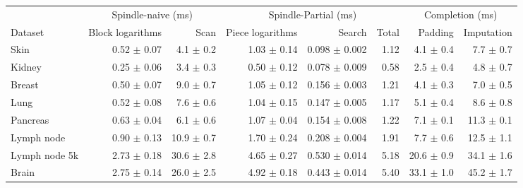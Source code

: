 \begin{tabular}{lrrrrrrr}
\toprule
 & \multicolumn{2}{c}{Spindle-naive (ms)} & \multicolumn{3}{c}{Spindle-Partial (ms)} & \multicolumn{2}{c}{Completion (ms)} \\
\cmidrule(lr){2-3} \cmidrule(lr){4-6} \cmidrule(lr){7-8}
Dataset & Block logarithms & Scan & Piece logarithms & Search & Total & Padding & Imputation \\
\midrule
Skin & 0.52 $\pm$ 0.07 & 4.1 $\pm$ 0.2 & 1.03 $\pm$ 0.14 & 0.098 $\pm$ 0.002 & 1.12 & 4.1 $\pm$ 0.4 & 7.7 $\pm$ 0.7 \\
Kidney & 0.25 $\pm$ 0.06 & 3.4 $\pm$ 0.3 & 0.50 $\pm$ 0.12 & 0.078 $\pm$ 0.009 & 0.58 & 2.5 $\pm$ 0.4 & 4.8 $\pm$ 0.7 \\
Breast & 0.50 $\pm$ 0.07 & 9.0 $\pm$ 0.7 & 1.05 $\pm$ 0.12 & 0.156 $\pm$ 0.003 & 1.21 & 4.1 $\pm$ 0.3 & 7.0 $\pm$ 0.5 \\
Lung & 0.52 $\pm$ 0.08 & 7.6 $\pm$ 0.6 & 1.04 $\pm$ 0.15 & 0.147 $\pm$ 0.005 & 1.17 & 5.1 $\pm$ 0.4 & 8.6 $\pm$ 0.8 \\
Pancreas & 0.63 $\pm$ 0.04 & 6.1 $\pm$ 0.6 & 1.07 $\pm$ 0.04 & 0.154 $\pm$ 0.008 & 1.22 & 7.1 $\pm$ 0.1 & 11.3 $\pm$ 0.1 \\
Lymph node & 0.90 $\pm$ 0.13 & 10.9 $\pm$ 0.7 & 1.70 $\pm$ 0.24 & 0.208 $\pm$ 0.004 & 1.91 & 7.7 $\pm$ 0.6 & 12.5 $\pm$ 1.1 \\
Lymph node 5k & 2.73 $\pm$ 0.18 & 30.6 $\pm$ 2.8 & 4.65 $\pm$ 0.27 & 0.530 $\pm$ 0.014 & 5.18 & 20.6 $\pm$ 0.9 & 34.1 $\pm$ 1.6 \\
Brain & 2.75 $\pm$ 0.14 & 26.0 $\pm$ 2.5 & 4.92 $\pm$ 0.18 & 0.443 $\pm$ 0.014 & 5.40 & 33.1 $\pm$ 1.0 & 45.2 $\pm$ 1.7 \\
\bottomrule
\end{tabular}
